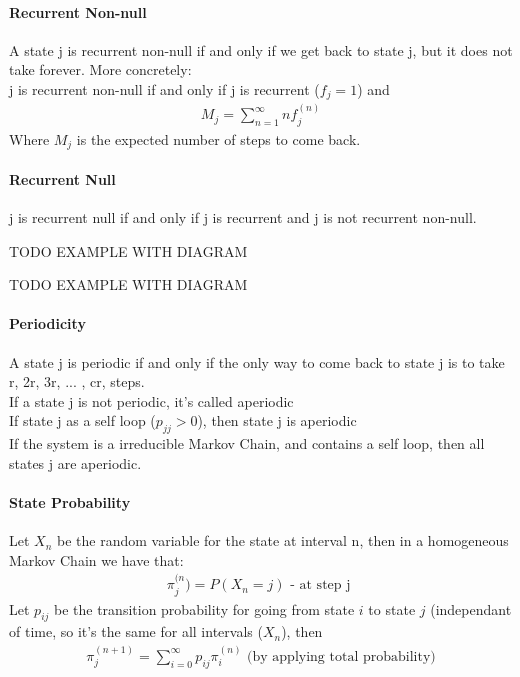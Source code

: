 \paragraph{Recurrent Non-null} A state j is recurrent non-null if and only if we
get back to state j, but it does not take forever. More concretely: \\[0.5cm]
j is recurrent non-null if and only if j is recurrent ($f_j = 1$) and
\begin{equation*} \begin{split}
	M_j = \sum_{n=1}^\infty n f_j^{(n)}
\end{split} \end{equation*}
Where $M_j$ is the expected number of steps to come back.

\paragraph{Recurrent Null} j is recurrent null if and only if j is recurrent and
j is not recurrent non-null.


TODO EXAMPLE WITH DIAGRAM

TODO EXAMPLE WITH DIAGRAM

\paragraph{Periodicity} A state j is periodic if and only if the only way to
come back to state j is to take r, 2r, 3r, ... , cr, steps.  \\[0.5cm]

If a state j is not periodic, it's called aperiodic \\[0.5cm]

If state j as a self loop ($p_{jj} > 0$), then state j is aperiodic \\[0.5cm]

If the system is a irreducible Markov Chain, and contains a self loop, then all
states j are aperiodic.

\paragraph{State Probability} 
Let $X_n$ be the random variable for the state at interval n, then in a
homogeneous Markov Chain we have that:
\begin{equation*} \begin{split}
	\pi_j^{(n}) = P(X_n = j) \mbox{ - at step j }
\end{split} \end{equation*}
Let $p_{ij}$ be the transition probability for going from state $i$ to state $j$
(independant of time, so it's the same for all intervals ($X_n$), then
\begin{equation*} \begin{split}
	\pi_j^{(n+1)} = \sum_{i=0}^\infty p_{ij} \pi_i^{(n)}
	\mbox{ (by applying total probability)}
\end{split} \end{equation*}

